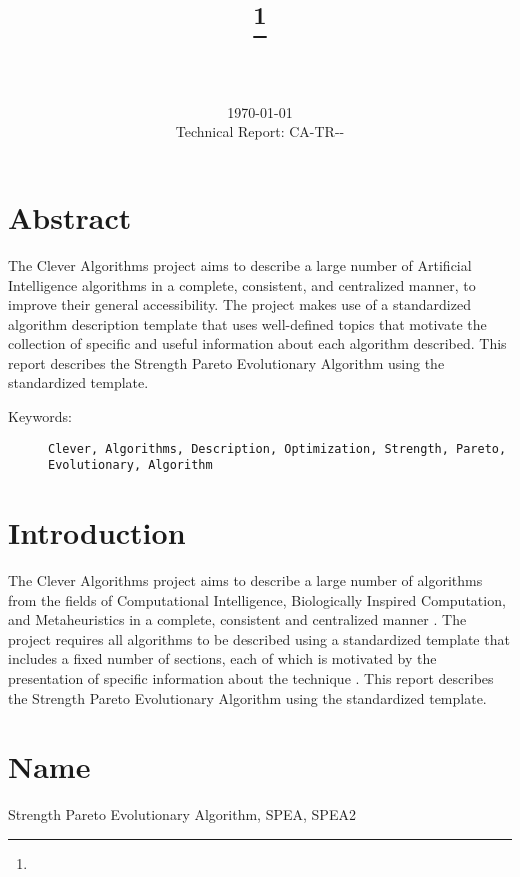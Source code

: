 \documentclass[a4paper, 11pt]{article}
\title{{\myreporttitle}\footnote{\myreportlicense}}
\author{\myreportauthor\\{\myreportemail}\\\small\myreportproject}
\date{\today\\{\small{Technical Report: CA-TR-{\myreportdate}-\myreportversion}}}
\begin{document}
\maketitle

\section*{Abstract} 
The Clever Algorithms project aims to describe a large number of Artificial Intelligence algorithms in a complete, consistent, and centralized manner, to improve their general accessibility. 
The project makes use of a standardized algorithm description template that uses well-defined topics that motivate the collection of specific and useful information about each algorithm described.
This report describes the Strength Pareto Evolutionary Algorithm using the standardized template. 

\begin{description}
	\item[Keywords:] {\small\texttt{Clever, Algorithms, Description, Optimization, Strength, Pareto, Evolutionary, Algorithm}}
\end{description} 

\section{Introduction} 
\label{sec:intro}
The Clever Algorithms project aims to describe a large number of algorithms from the fields of Computational Intelligence, Biologically Inspired Computation, and Metaheuristics in a complete, consistent and centralized manner \cite{Brownlee2010}.
The project requires all algorithms to be described using a standardized template that includes a fixed number of sections, each of which is motivated by the presentation of specific information about the technique \cite{Brownlee2010a}.
This report describes the Strength Pareto Evolutionary Algorithm using the standardized template. 

\section{Name} 
\label{sec:name}
Strength Pareto Evolutionary Algorithm, SPEA, SPEA2
\end{document}

